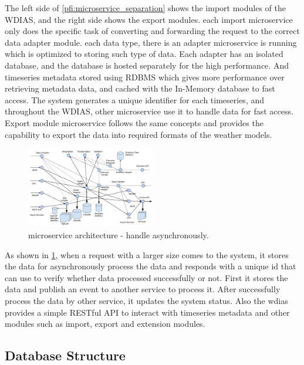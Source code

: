 \documentclass[conference]{IEEEtran}
\begin{document}
The left side of \cref{pfi:microservice_separation} shows the import modules of the WDIAS, and the right side shows the export modules. each import microservice only does the specific task of converting and forwarding the request to the correct data adapter module. each data type, there is an adapter microservice is running which is optimized to storing such type of data. Each adapter has an isolated database, and the database is hosted separately for the high performance.
And timeseries metadata stored using RDBMS which gives more performance over retrieving metadata data, and cached with the In-Memory database to fast access. The system generates a unique identifier for each timeseries, and throughout the WDIAS, other microservice use it to handle data for fast access. Export module microservice follows the same concepts and provides the capability to export the data into required formats of the weather models.

\begin{figure}[t!]
\centerline{\includegraphics[width=0.5\textwidth]{method/microservice/microservice_architecture-handle_on_async-v4.pdf}}
\caption{microservice architecture - handle asynchronously.}
\label{pfi:microservice_architecture_async}
\end{figure}

As shown in \cref{pfi:microservice_architecture_async}, when a request with a larger size comes to the system, it stores the data for asynchronously process the data and responds with a unique id that can use to verify whether data processed successfully or not. First it stores the data and publish an event to another service to process it. After successfully process the data by other service, it updates the system status. Also the \acrshort{wdias} provides a simple RESTful API to interact with timeseries metadata and other modules such as import, export and extension modules.


\subsection{Database Structure}
\label{psubse:wdias_database}
\end{document}
